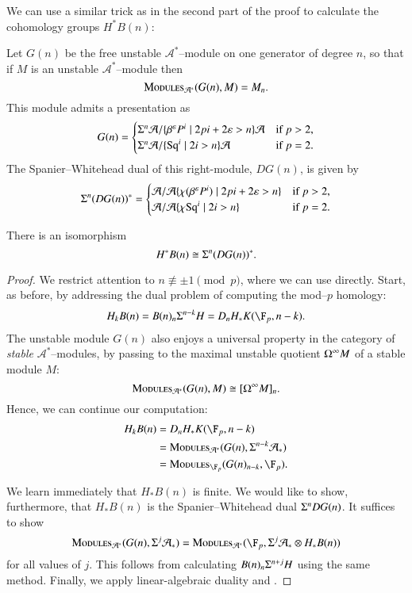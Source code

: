 We can use a similar trick as in the second part of the proof to calculate the cohomology groups $H^* B(n)$:

\begin{definition}\label{SpanierWhiteheadDualOfGeneratingModule}
Let $G(n)$ be the free unstable $\mathcal A^*$--module on one generator of degree $n$, so that if $M$ is an unstable $\mathcal A^*$--module then \[\normalfont\textsc{Modules}_{\mathcal A^*}(G(n), M) = M_n.\]  This module admits a presentation as \[G(n) = \begin{cases} \Sigma^n \mathcal A / \{\beta^\varepsilon P^i \mid 2pi + 2\varepsilon > n\}\mathcal A & \text{if $p > 2$}, \\ \Sigma^n \mathcal A / \{\operatorname{Sq}^i \mid 2i > n\}\mathcal A & \text{if $p = 2$}. \end{cases}\]  The Spanier--Whitehead dual of this right-module, $DG(n)$, is given by \[\Sigma^n (D G(n))^* = \begin{cases}\mathcal A / \mathcal A \{\chi(\beta^\varepsilon P^i) \mid 2pi + 2\varepsilon > n\} & \text{if $p > 2$}, \\ \mathcal A / \mathcal A \{\chi{\operatorname{Sq}^i} \mid 2i > n\} & \text{if $p = 2$}. \end{cases}\]
\end{definition}

\begin{theorem}
There is an isomorphism \[H^* B(n) \cong \Sigma^n(DG(n))^*.\]
\end{theorem}
\begin{proof}
We restrict attention to $n \not\equiv \pm 1 \pmod p$, where we can use  directly.  Start, as before, by addressing the dual problem of computing the mod--$p$ homology:
\begin{align*}
H_k B(n) = B(n)_n \Susp^{n-k} H = D_n H_* K(\F_p, n-k).
\end{align*}
The unstable module $G(n)$ also enjoys a universal property in the category of \emph{stable} $\mathcal A^*$--modules, by passing to the maximal unstable quotient $\Omega^\infty M$ of a stable module $M$: \[\normalfont\textsc{Modules}_{\mathcal A^*}(G(n), M) \cong [\Omega^\infty M]_n.\]  Hence, we can continue our computation:
\begin{align*}
H_k B(n) & = D_n H_* K(\F_p, n-k) \\
& = \CatOf{Modules}_{\mathcal A^*}(G(n), \Susp^{n-k} \mathcal A_*) \\
& = \CatOf{Modules}_{\F_p}(G(n)_{n-k}, \F_p).
\end{align*}

We learn immediately that $H_* B(n)$ is finite.  We would like to show, furthermore, that $H_* B(n)$ is the Spanier--Whitehead dual $\Sigma^n DG(n)$.  It suffices to show \[\CatOf{Modules}_{\mathcal A^*}(G(n), \Susp^j \mathcal A_*) = \CatOf{Modules}_{\mathcal A^*}(\F_p, \Susp^j \mathcal A_* \otimes H_* B(n))\] for all values of $j$.  This follows from calculating $B(n)_n \Sigma^{n+j} H$ using the same method.  Finally, we apply linear-algebraic duality and .
\end{proof}

